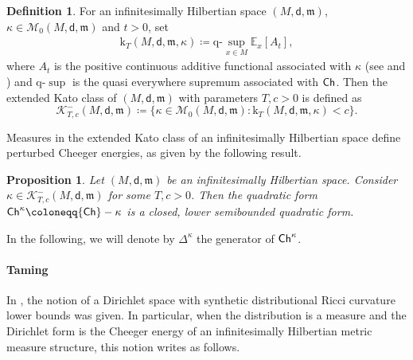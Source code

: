 \documentclass[10pt]{article}
\newcommand{\K}{\mathscr{K}}
\newcommand{\m}{\mathfrak{m}}
\newcommand{\M}{{\mathit{M}}}
\renewcommand{\k}{\mathrm{k}}
\newcommand{\dist}{\mathsf{d}}
\newcommand{\df}{\coloneqq}
\newcommand{\Ch}{{\sf Ch}}
\theoremstyle{plain}
\newtheorem{proposition}[theorem]{Proposition}
\theoremstyle{definition}
\newtheorem{definition}[theorem]{Definition}
\begin{document}
\begin{definition}\label{def:Kato}
For  an infinitesimally Hilbertian  space $ (M,\dist,\m)$, $\kappa \in \mathcal{M}_0(M,\dist,\m)$ and $t>0$, set
\begin{align*}
\k_T(\M,\dist,\m,\kappa)\df\text{q-}\sup_{x \in M} \mathbb{E}_x[A_t],
\end{align*}
where $A_t$ is the positive continuous additive functional associated with $\kappa$ (see \cite[Theorems 4.2.6 and 6.7.2]{CF} and \cite[Lemma 2.11]{ERST}) and q-$\sup$ is the quasi everywhere supremum associated with $\Ch$. Then the extended Kato class of $(M,\dist,\m)$ with parameters $T,c>0$ is defined as
\[
\K^-_{T,c}(\M,\dist,\m) \df \{ \kappa \in \mathcal{M}_0(M,\dist,\m) : \k_T(M,\dist,\m,\kappa)<c \}.
\]
\end{definition}

Measures in the extended Kato class of  an infinitesimally Hilbertian space define perturbed Cheeger energies, as given by the following result.

\begin{proposition}
    Let $ (M,\dist,\m)$ be an infinitesimally Hilbertian  space. Consider $\kappa \in \K^-_{T,c}(\M,\dist,\m)$ for some $T,c>0$. Then the quadratic form $\Ch^\kappa \df \Ch-\kappa$ is a closed, lower semibounded quadratic form.
\end{proposition}

In the following, we will denote by $\Delta^\kappa$ the generator of $\Ch^\kappa$.


\paragraph{Taming} In \cite{ERST}, the notion of a Dirichlet space with synthetic distributional Ricci curvature lower bounds was given. In particular, when the distribution is a measure and the Dirichlet form is the Cheeger energy of an infinitesimally Hilbertian metric measure structure, this notion writes as follows.
\end{document}
